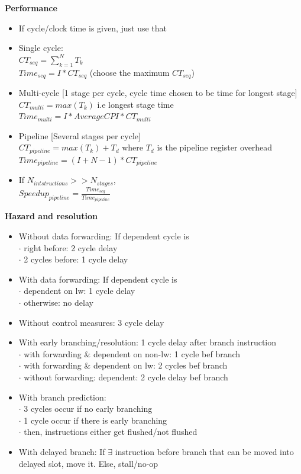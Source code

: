 \documentclass[a4paper]{article} \usepackage[backend=biber, style=numeric, sorting=none]{biblatex}
\begin{document}
\begin{multicols*}{4}
\textbf{{Performance}}
\begin{itemize}[leftmargin=*]
\itemsep -0.3em
\item If cycle/clock time is given, just use that 
\item Single cycle: 
    \\ $CT_{seq} = \sum^N_{k=1}T_k$
    \\ $Time_{seq}  = I * CT_{seq}$ (choose the maximum $CT_{seq}$)
\item Multi-cycle [1 stage per cycle, cycle time chosen to be time for longest stage]
    \\ $CT_{multi} = max(T_k)$ i.e longest stage time
    \\ $Time_{multi} = I * Average CPI * CT_{multi}$ 
\item Pipeline [Several stages per cycle]
    \\ $CT_{pipeline} = max(T_k) + T_d$ where $T_d$ is the pipeline register overhead 
    \\ $Time_{pipeline} = (I + N - 1) * CT_{pipeline}$ 
\item If $N_{intstructions} >> N_{stages}$, 
    \\ $Speedup_{pipeline} = \frac{Time_{seq}}{Time_{pipeline}}$
\end{itemize}

\textbf{{Hazard and resolution}}
\begin{itemize}[leftmargin=*]
\itemsep -0.5em
\item Without data forwarding: If dependent cycle is
    \\ $\cdot$ right before: 2 cycle delay
    \\ $\cdot$ 2 cycles before: 1 cycle delay
\item With data forwarding: If dependent cycle is
    \\ $\cdot$ dependent on lw: 1 cycle delay
    \\ $\cdot$ otherwise: no delay
\item Without control measures: 3 cycle delay 
\item With early branching/resolution: 1 cycle delay after branch instruction  
    \\ $\cdot$ with forwarding \& dependent on non-lw: 1 cycle bef branch
    \\ $\cdot$ with forwarding \& dependent on lw: 2 cycles bef branch 
    \\ $\cdot$ without forwarding: dependent: 2 cycle delay bef branch 
\item With branch prediction: 
    \\ $\cdot$ 3 cycles occur if no early branching
    \\ $\cdot$ 1 cycle occur if there is early branching
    \\ $\cdot$ then, instructions either get flushed/not flushed
\item With delayed branch: If $\exists$ instruction before branch that can be moved into delayed slot, move it. Else, stall/no-op
\end{itemize}


\end{multicols*}
\end{document}
